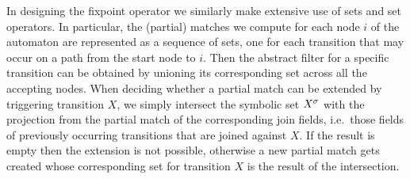 In designing the fixpoint operator we similarly make extensive use of sets and 
set operators.
In particular, the (partial) matches we compute for each node $i$ of the 
automaton are represented as a sequence of sets, one for each transition that
may occur on a path from the start node to $i$.
Then the abstract filter for a specific transition can be obtained by unioning 
its corresponding set across all the accepting nodes.
When deciding whether a partial match can be extended by triggering transition 
$X$, we simply intersect the symbolic set ${X}^{\sigma}$ with the projection from 
the partial match of the corresponding join fields, i.e.\ those fields of 
previously occurring transitions that are joined against $X$.
If the result is empty then the extension is not possible, otherwise a new 
partial match gets created whose corresponding set for transition $X$ is the 
result of the intersection.   





 
